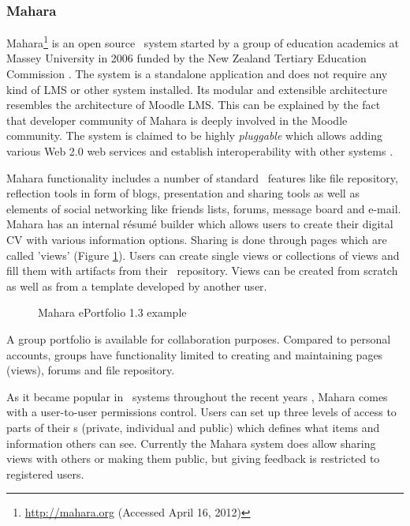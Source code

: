 \subsubsection{Mahara}
Mahara\footnote{\url{http://mahara.org} (Accessed April 16, 2012)} is an open
source \ep~system started by a group of education academics at Massey University in 2006 funded by the New
Zealand Tertiary Education Commission \citep{Brown2007}. The system is a
standalone application and does not require any kind of LMS or other system
installed. Its modular and extensible architecture resembles the architecture of
Moodle LMS. This can be explained by the fact that developer community of Mahara
is deeply involved in the Moodle community. The system is claimed to be highly
\textit{pluggable} which allows adding various Web 2.0 web services and
establish interoperability with other systems \citep{MaharaGovernanceGroup2011}.

Mahara functionality includes a number of standard \ep~features like file
repository, reflection tools in form of blogs, presentation and sharing tools as
well as elements of social networking like friends lists, forums, message board
and e-mail. Mahara has an internal r\'{e}sum\'{e} builder which allows users to
create their digital CV with various information options. Sharing is done
through pages which are called 'views' (Figure \ref{fig:maharaep}). Users can
create single views or collections of views and fill them with artifacts from
their \ep~repository. Views can be created from scratch as well as from a
template developed by another user.

\begin{figure}[htb]
\centering
\setlength\fboxsep{0pt}
\setlength\fboxrule{0.5pt}
\caption{Mahara ePortfolio 1.3 example}
\label{fig:maharaep}
\end{figure}

A group portfolio is available for collaboration purposes. Compared to personal
accounts, groups have functionality limited to creating and maintaining pages
(views), forums and file repository.

As it became popular in \ep~systems throughout the recent years
\citep{Waters2009}, Mahara comes with a user-to-user permissions control. Users
can set up three levels of access to parts of their \ep s (private, individual
and public) which defines what items and information others can see. Currently
the Mahara system does allow sharing views with others or making them public,
but giving feedback is restricted to registered users.

